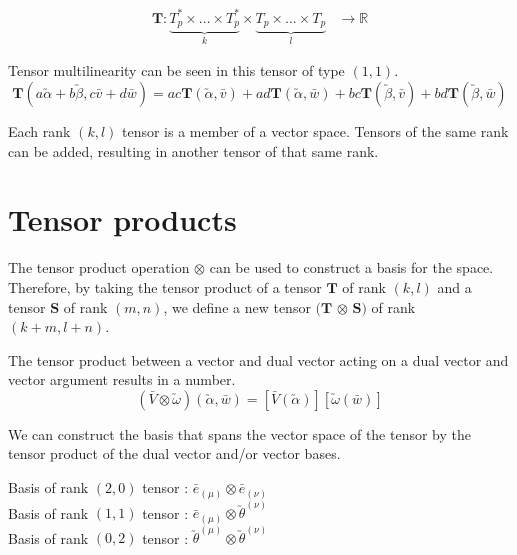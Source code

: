 \documentclass[11pt]{article}
\begin{document}
		\begin{equation}
		\begin{aligned}
		\boldsymbol{T} : \underbrace{T^{*} _{p} \times ... \times T^{*} _{p}}_{k} \times \underbrace{T_{p} \times ... \times T_{p}}_{l} &\to \mathbb{R}
		\end{aligned}
		\label{eq:mapping}
		\end{equation}
	\begin{example}
	Tensor multilinearity can be seen in this tensor of type $(1,1)$.
	\begin{equation}
	\boldsymbol{T}(a\utilde{\alpha} + b\utilde{\beta}, c\bar{v} + d\bar{w}) = ac\boldsymbol{T}(\utilde{\alpha}, \bar{v}) + ad\boldsymbol{T}(\utilde{\alpha}, \bar{w}) + bc\boldsymbol{T}(\utilde{\beta}, \bar{v}) + bd\boldsymbol{T}(\utilde{\beta}, \bar{w})
	\end{equation}
	\end{example}
		Each rank $(k,l)$ tensor is a member of a vector space. Tensors of the same rank can be added, resulting in another tensor of that same rank. 
	
	\newpage
	
	\section{Tensor products}\label{sec:class_style}
	
    The tensor product operation $\otimes$ can be used to construct a basis for the space. Therefore, by taking the tensor product of a tensor $\boldsymbol{T}$ of rank $(k,l)$ and a tensor $\boldsymbol{S}$ of rank $(m,n)$, we define a new tensor $(\boldsymbol{T}$ $\otimes$ $\boldsymbol{S})$ of rank $(k+m, l+n)$.
	\begin{example}
	The tensor product between a vector and dual vector acting on a dual vector and vector argument results in a number.
	\begin{equation}
	( \bar{V} \otimes\utilde{\omega}) (\utilde{\alpha}, \bar{w}) = [\bar{V}(\utilde{\alpha})][\utilde{\omega}(\bar{w})]
	\label{eq:TP1}
	\end{equation}
	\end{example}
	
	 We can construct the basis that spans the vector space of the tensor by the tensor product of the dual vector and/or vector bases.
	\begin{example}
	Basis of rank $(2,0)$ tensor : $\bar{e}_{(\mu)} \otimes \bar{e}_{(\nu)}$\\
	Basis of rank $(1,1)$ tensor : $\bar{e}_{(\mu)} \otimes \utilde{\theta}^{(\nu)}$\\
	Basis of rank $(0,2)$ tensor : $\utilde{\theta}^{(\mu)} \otimes \utilde{\theta}^{(\nu)}$
	\end{example}
	
\end{document}
